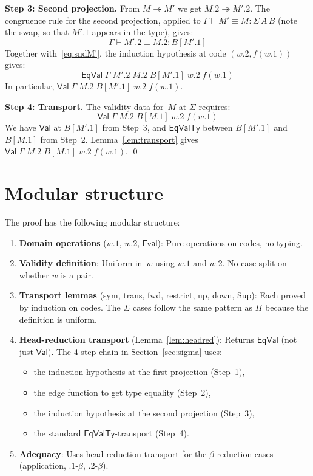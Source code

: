 \documentclass[11pt]{article}
\newcommand{\Val}{\mathsf{Val}}
\newcommand{\EqVal}{\mathsf{EqVal}}
\newcommand{\EqValTy}{\mathsf{EqValTy}}
\newcommand{\HasType}{\vdash}
\newcommand{\ConvTm}{\equiv}
\newcommand{\HeadRed}{\twoheadrightarrow}
\newcommand{\EvalFun}{\mathsf{Eval}}
\newcommand{\pj}[2]{#1\mbox{.}#2}
\begin{document}
\medskip
\noindent\textbf{Step 3: Second projection.}
From $M \HeadRed M'$ we get $\pj{M}{2} \HeadRed \pj{M'}{2}$.  The congruence
rule for the second projection, applied to $\Gamma \HasType M' \ConvTm M :
\Sigma\,A\,B$ (note the swap, so that $\pj{M'}{1}$ appears in the type), gives:
\[
  \Gamma \HasType \pj{M'}{2} \ConvTm \pj{M}{2} : B[\pj{M'}{1}]
\]
Together with~\eqref{eq:sndM'}, the induction hypothesis at code
$(\pj{w}{2}, f(\pj{w}{1}))$ gives:
\begin{equation}\label{eq:eqsnd}
  \EqVal\;\Gamma\;\pj{M'}{2}\;\pj{M}{2}\;B[\pj{M'}{1}]\;\pj{w}{2}\;f(\pj{w}{1})
\end{equation}
In particular, $\Val\;\Gamma\;\pj{M}{2}\;B[\pj{M'}{1}]\;\pj{w}{2}\;f(\pj{w}{1})$.

\medskip
\noindent\textbf{Step 4: Transport.}
The validity data for~$M$ at $\Sigma$ requires:
\[
  \Val\;\Gamma\;\pj{M}{2}\;B[\pj{M}{1}]\;\pj{w}{2}\;f(\pj{w}{1})
\]
We have $\Val$ at $B[\pj{M'}{1}]$ from Step~3, and $\EqValTy$ between
$B[\pj{M'}{1}]$ and $B[\pj{M}{1}]$ from Step~2.
Lemma~\ref{lem:transport} gives
$\Val\;\Gamma\;\pj{M}{2}\;B[\pj{M}{1}]\;\pj{w}{2}\;f(\pj{w}{1})$. \qed

\section{Modular structure}

The proof has the following modular structure:

\begin{enumerate}
\item \textbf{Domain operations} ($\pj{w}{1}$, $\pj{w}{2}$, $\EvalFun$):
  Pure operations on codes, no typing.

\item \textbf{Validity definition}: Uniform in~$w$ using $\pj{w}{1}$ and
  $\pj{w}{2}$.  No case split on whether $w$ is a pair.

\item \textbf{Transport lemmas} (sym, trans, fwd, restrict, up, down, Sup):
  Each proved by induction on codes.  The $\Sigma$ cases follow the same
  pattern as $\Pi$ because the definition is uniform.

\item \textbf{Head-reduction transport} (Lemma~\ref{lem:headred}):
  Returns $\EqVal$ (not just $\Val$).  The 4-step chain in
  Section~\ref{sec:sigma} uses:
  \begin{itemize}
  \item the induction hypothesis at the first projection (Step~1),
  \item the edge function to get type equality (Step~2),
  \item the induction hypothesis at the second projection (Step~3),
  \item the standard $\EqValTy$-transport (Step~4).
  \end{itemize}

\item \textbf{Adequacy}: Uses head-reduction transport for the
  $\beta$-reduction cases (application, $\pj{}{1}$-$\beta$, $\pj{}{2}$-$\beta$).
\end{enumerate}
\end{document}
